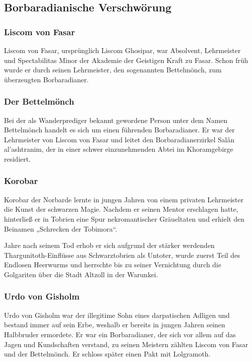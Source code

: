 \subsection{Borbaradianische Verschwörung}
\subsubsection{Liscom von Fasar}
Liscom von Fasar, ursprünglich Liscom Ghosipar, war Absolvent, Lehrmeister und Spectabilitas Minor der Akademie der Geistigen Kraft zu Fasar. Schon früh wurde er durch seinen Lehrmeister, den sogenannten Bettelmönch, zum überzeugten Borbaradianer. 

\subsubsection{Der Bettelmönch}
Bei der als Wanderprediger bekannt gewordene Person unter dem Namen Bettelmönch handelt es sich um einen führenden Borbaradianer. Er war der Lehrmeister von Liscom von Fasar und leitet den Borbaradianerzirkel Salân al'ashtranim, der in einer schwer einzunehmenden Abtei im Khoramgebirge residiert. 

\subsubsection{Korobar}
Korobar der Norbarde lernte in jungen Jahren von einem privaten Lehrmeister die Kunst der schwarzen Magie. Nachdem er seinen Mentor erschlagen hatte, hinterließ er in Tobrien eine Spur nekromantischer Gräueltaten und erhielt den Beinamen „Schrecken der Tobimora“.

Jahre nach seinem Tod erhob er sich aufgrund der stärker werdenden Thargunitoth-Einflüsse aus Schwarztobrien als Untoter, wurde zuerst Teil des Endlosen Heerwurms und herrschte bis zu seiner Vernichtung durch die Golgariten über die Stadt Altzoll in der Warunkei. 

\subsubsection{Urdo von Gisholm}
Urdo von Gisholm war der illegitime Sohn eines darpatischen Adligen und bestand immer auf sein Erbe, weshalb er bereits in jungen Jahren seinen Halbbruder ermordete. Er war ein Borbaradianer, der sich vor allem auf das Jagen und Kundschaften verstand, zu seinen Meistern zählten Liscom von Fasar und der Bettelmönch. Er schloss später einen Pakt mit Lolgramoth. 

